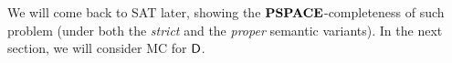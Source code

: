 



We will come back to SAT later, showing the $\textbf{PSPACE}$-completeness of such problem  (under both the \emph{strict} and the \emph{proper} semantic variants). In the next section, we will consider MC for $\mathsf{D}$.
